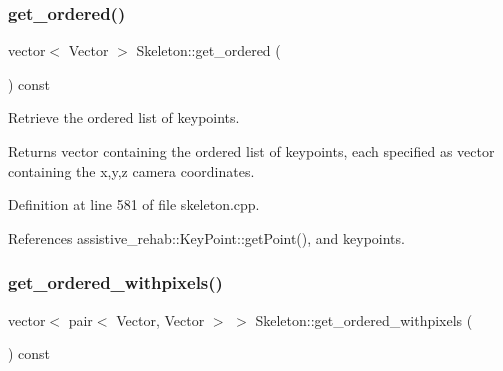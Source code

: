 \subsubsection{\texorpdfstring{get\_ordered()}{get\_ordered()}}
{\footnotesize\ttfamily vector$<$ Vector $>$ Skeleton\+::get\+\_\+ordered (\begin{DoxyParamCaption}{ }\end{DoxyParamCaption}) const\hspace{0.3cm}{\ttfamily [virtual]}}



Retrieve the ordered list of keypoints. 

\begin{DoxyReturn}{Returns}
vector containing the ordered list of keypoints, each specified as vector containing the x,y,z camera coordinates. 
\end{DoxyReturn}


Definition at line 581 of file skeleton.\+cpp.


\begin{DoxyCode}{0}

\end{DoxyCode}


References assistive\+\_\+rehab\+::\+Key\+Point\+::get\+Point(), and keypoints.

\mbox{\label{classassistive__rehab_1_1Skeleton_a270506cde494cb4261c7892edb46ce53}} 
\subsubsection{\texorpdfstring{get\_ordered\_withpixels()}{get\_ordered\_withpixels()}}
{\footnotesize\ttfamily vector$<$ pair$<$ Vector, Vector $>$ $>$ Skeleton\+::get\+\_\+ordered\+\_\+withpixels (\begin{DoxyParamCaption}{ }\end{DoxyParamCaption}) const\hspace{0.3cm}{\ttfamily [virtual]}}



